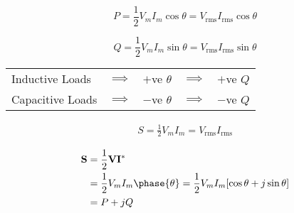 \begin{multicols}{2}
\begin{CheatsheetEntryFrame}


        \begin{equation*}
            P = \frac{1}{2} V_m I_m \cos{\theta} = V_{\text{rms}} I_{\text{rms}} \cos{\theta}
        \end{equation*}

        \begin{equation*}
            Q = \frac{1}{2} V_m I_m \sin{\theta} = V_{\text{rms}} I_{\text{rms}} \sin{\theta}
        \end{equation*}
        {\scriptsize%
        \begin{tabular}{lcccc}
            Inductive Loads
                & $\implies$
                & $+$ve $\theta$
                & $\implies$
                & $+$ve $Q$
                \\
            Capacitive Loads
                & $\implies$
                & $-$ve $\theta$
                & $\implies$
                & $-$ve $Q$
                \\
        \end{tabular}
        }

        \CheatsheetEntryExtraSeparation

        \begin{align*}
            S = \frac{1}{2} V_m I_m = V_{\text{rms}} I_{\text{rms}}
        \end{align*}

    \end{CheatsheetEntryFrame}

    \begin{CheatsheetEntryFrame}

        \begin{align*}
            \mathbf{S}
                &= \frac{1}{2} \mathbf{V} \mathbf{I}^* \\
                &= \frac{1}{2} V_m I_m \phase{\theta}
                = \frac{1}{2} V_m I_m \brackets*{\cos{\theta} + j \sin{\theta}} \\
                &= P + j Q
        \end{align*}


\end{CheatsheetEntryFrame}
\end{multicols}
